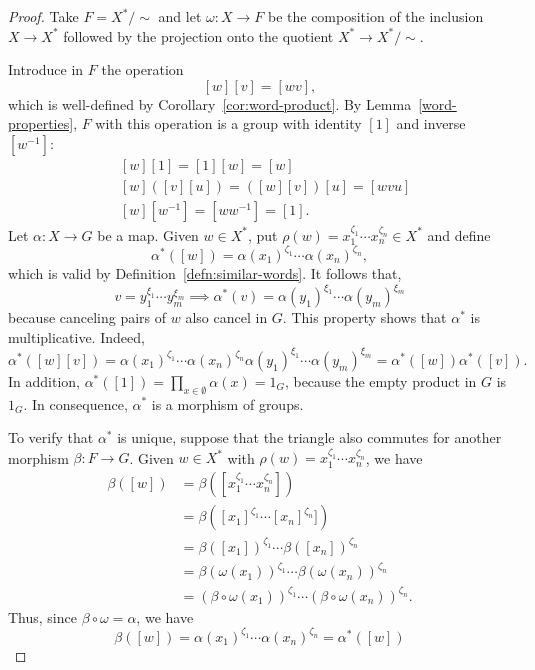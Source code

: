 \begin{proof}
    Take $F=X^*/{\sim}$ and let $\omega\colon X\to F$ be the composition of the inclusion $X\to X^*$ followed by the projection onto the quotient $X^*\to X^*/{\sim}$.
    
    Introduce in $F$ the operation
    $$
        [w][v] = [wv],
    $$
    which is well-defined by Corollary~\ref{cor:word-product}. By Lemma~\ref{word-properties}, $F$ with this operation is a group with identity $[1]$ and inverse $[w^{-1}]$:
    \begin{align*}
        &[w][1] = [1][w] = [w]\\
        &[w]([v][u]) = ([w][v])[u] = [wvu]\\
        &[w][w^{-1}] = [ww^{-1}]=[1].
    \end{align*}
    Let $\alpha\colon X\to G$ be a map. Given $w\in X^*$, put $\rho(w)=x_1^{\zeta_1}\cdots x_n^{\zeta_n}\in X^*$ and define
    $$
        \alpha^*([w]) = \alpha(x_1)^{\zeta_1}
            \cdots\alpha(x_n)^{\zeta_n},
    $$
    which is valid by Definition~\ref{defn:similar-words}. It follows that,
    \begin{equation}\label{eq:alpha-multiplication}
        v=y_1^{\xi_1}\cdots y_m^{\xi_m}
            \implies
            \alpha^*(v)=\alpha(y_1)^{\xi_1}\cdots\alpha(y_m)^{\xi_m}
    \end{equation}
    because canceling pairs of $w$ also cancel in $G$. This property shows that $\alpha^*$ is multiplicative. Indeed,
    $$
        \alpha^*([w][v])=\alpha(x_1)^{\zeta_1}\cdots\alpha(x_n)^{\zeta_n}
                \alpha(y_1)^{\xi_1}\cdots\alpha(y_m)^{\xi_m}
            = \alpha^*([w])\alpha^*([v]).
    $$
    In addition, $\alpha^*([1]) = \prod_{x\in\emptyset}\alpha(x)=1_G$, because the empty product in $G$ is $1_G$. In consequence, $\alpha^*$ is a morphism of groups.
        
    To verify that $\alpha^*$ is unique, suppose that the triangle also commutes for another morphism $\beta\colon F\to G$. Given $w\in X^*$ with $\rho(w)=x_1^{\zeta_1}\cdots x_n^{\zeta_n}$, we have
    \begin{align*}
        \beta([w]) &= \beta([x_1^{\zeta_1}\cdots x_n^{\zeta_n}])\\
            &= \beta([x_1]^{\zeta_1}\cdots[x_n]^{\zeta_n}])\\
            &= \beta([x_1])^{\zeta_1}\cdots\beta([x_n])^{\zeta_n}\\
            &= \beta(\omega(x_1))^{\zeta_1}\cdots
                \beta(\omega(x_n))^{\zeta_n}\\
            &= (\beta\circ\omega(x_1))^{\zeta_1}\cdots
                (\beta\circ\omega(x_n))^{\zeta_n}.
    \end{align*}
    Thus, since $\beta\circ\omega=\alpha$, we have
    $$
        \beta([w])=\alpha(x_1)^{\zeta_1}\cdots\alpha(x_n)^{\zeta_n}
                = \alpha^*([w])
    $$
\end{proof}



